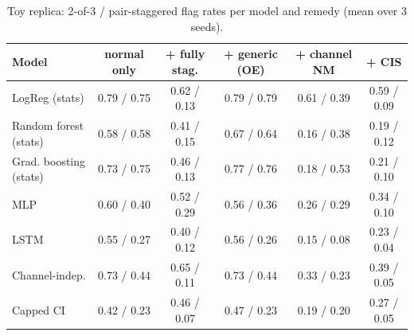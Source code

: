 \begin{table}[h]\centering\small
\caption{Toy replica: 2-of-3 / pair-staggered flag rates per model and remedy (mean over 3 seeds).}\label{tab:toyremedy}
\setlength{\tabcolsep}{3pt}\begin{tabular}{lccccc}\toprule
Model & normal only & + fully stag. & + generic (OE) & + channel NM & + CIS\\\midrule
LogReg (stats) & 0.79 / 0.75 & 0.62 / 0.13 & 0.79 / 0.79 & 0.61 / 0.39 & 0.59 / 0.09\\
Random forest (stats) & 0.58 / 0.58 & 0.41 / 0.15 & 0.67 / 0.64 & 0.16 / 0.38 & 0.19 / 0.12\\
Grad. boosting (stats) & 0.73 / 0.75 & 0.46 / 0.13 & 0.77 / 0.76 & 0.18 / 0.53 & 0.21 / 0.10\\
MLP & 0.60 / 0.40 & 0.52 / 0.29 & 0.56 / 0.36 & 0.26 / 0.29 & 0.34 / 0.10\\
LSTM & 0.55 / 0.27 & 0.40 / 0.12 & 0.56 / 0.26 & 0.15 / 0.08 & 0.23 / 0.04\\
Channel-indep. & 0.73 / 0.44 & 0.65 / 0.11 & 0.73 / 0.44 & 0.33 / 0.23 & 0.39 / 0.05\\
Capped CI & 0.42 / 0.23 & 0.46 / 0.07 & 0.47 / 0.23 & 0.19 / 0.20 & 0.27 / 0.05\\
\bottomrule\end{tabular}\end{table}


